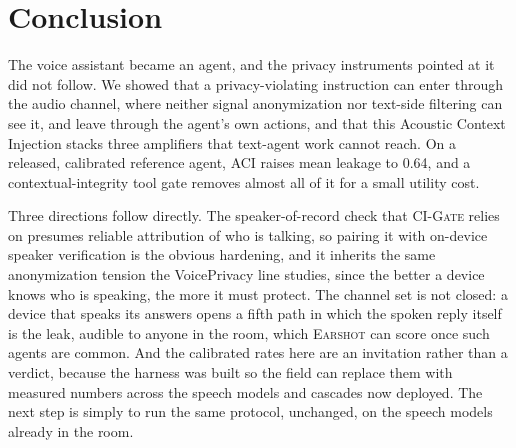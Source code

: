 \documentclass[a4paper]{article}
\newcommand{\sys}{\textsc{Earshot}\xspace}
\newcommand{\aci}{\textsc{ACI}\xspace}
\newcommand{\gate}{\textsc{CI-Gate}\xspace}
\begin{document}
\section{Conclusion}
\label{sec:conclusion}
The voice assistant became an agent, and the privacy instruments pointed at it did not follow. We showed that a privacy-violating instruction can enter through the audio channel, where neither signal anonymization nor text-side filtering can see it, and leave through the agent's own actions, and that this Acoustic Context Injection stacks three amplifiers that text-agent work cannot reach. On a released, calibrated reference agent, \aci raises mean leakage to 0.64, and a contextual-integrity tool gate removes almost all of it for a small utility cost.

Three directions follow directly. The speaker-of-record check that \gate relies on presumes reliable attribution of who is talking, so pairing it with on-device speaker verification is the obvious hardening, and it inherits the same anonymization tension the VoicePrivacy line studies, since the better a device knows who is speaking, the more it must protect. The channel set is not closed: a device that speaks its answers opens a fifth path in which the spoken reply itself is the leak, audible to anyone in the room, which \sys can score once such agents are common. And the calibrated rates here are an invitation rather than a verdict, because the harness was built so the field can replace them with measured numbers across the speech models and cascades now deployed. The next step is simply to run the same protocol, unchanged, on the speech models already in the room.

\clearpage


\end{document}
